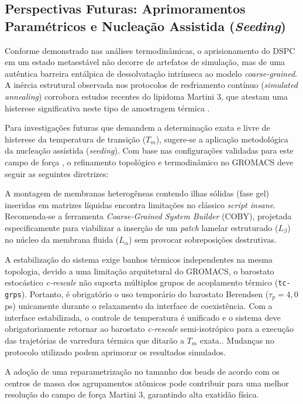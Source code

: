


\subsection{Perspectivas Futuras: Aprimoramentos Paramétricos e Nucleação Assistida (\textit{Seeding})}

Conforme demonstrado nas análises termodinâmicas, o aprisionamento do DSPC em um estado metaestável não decorre de artefatos de simulação, mas de uma autêntica barreira entálpica de dessolvatação intrínseca ao modelo \textit{coarse-grained}. A inércia estrutural observada nos protocolos de resfriamento contínuo (\textit{simulated annealing}) corrobora estudos recentes do lipidoma Martini 3, que atestam uma histerese significativa neste tipo de amostragem térmica \cite{pedersen2024}. 

Para investigações futuras que demandem a determinação exata e livre de histerese da temperatura de transição ($T_m$), sugere-se a aplicação metodológica da nucleação assistida (\textit{seeding}). Com base nas configurações validadas para este campo de força \cite{pedersen2024}, o refinamento topológico e termodinâmico no GROMACS deve seguir as seguintes diretrizes:

A montagem de membranas heterogêneas contendo ilhas sólidas (fase gel) inseridas em matrizes líquidas encontra limitações no clássico \textit{script insane}. Recomenda-se a ferramenta \textit{Coarse-Grained System Builder} (COBY), projetada especificamente para viabilizar a inserção de um \textit{patch} lamelar estruturado ($L_\beta$) no núcleo da membrana fluida ($L_\alpha$) sem provocar sobreposições destrutivas.

A estabilização do sistema exige banhos térmicos independentes na mesma topologia, devido a uma limitação arquitetural do GROMACS, o barostato estocástico \textit{c-rescale} não suporta múltiplos grupos de acoplamento térmico (\texttt{tc-grps}). Portanto, é obrigatório o uso temporário do barostato Berendsen ($\tau_p = 4,0$ ps) unicamente durante o relaxamento da interface de coexistência. Com a interface estabilizada, o controle de temperatura é unificado e o sistema deve obrigatoriamente retornar ao barostato \textit{c-rescale} semi-isotrópico para a execução das trajetórias de varredura térmica que ditarão a $T_m$ exata.\cite{pedersen2024}. Mudanças no protocolo utilizado podem aprimorar os resultados simulados.

A adoção de uma reparametrização no tamanho dos beads de acordo com os centros de massa dos agrupamentos atômicos pode contribuir para uma melhor resolução do campo de força Martini 3, garantindo alta exatidão física.
